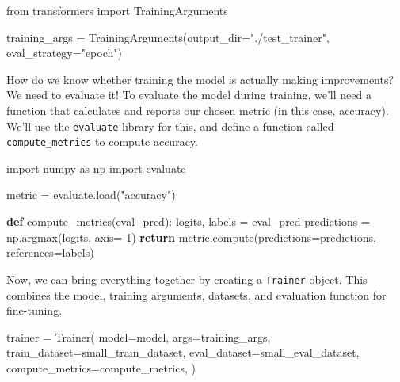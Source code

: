 \documentclass[
  letterpaper,
  DIV=11,
  numbers=noendperiod]{scrreprt}
\newenvironment{Shaded}{\begin{snugshade}}{\end{snugshade}}
\newcommand{\ControlFlowTok}[1]{\textcolor[rgb]{0.00,0.23,0.31}{\textbf{#1}}}
\newcommand{\DecValTok}[1]{\textcolor[rgb]{0.68,0.00,0.00}{#1}}
\newcommand{\ImportTok}[1]{\textcolor[rgb]{0.00,0.46,0.62}{#1}}
\newcommand{\KeywordTok}[1]{\textcolor[rgb]{0.00,0.23,0.31}{\textbf{#1}}}
\newcommand{\NormalTok}[1]{\textcolor[rgb]{0.00,0.23,0.31}{#1}}
\newcommand{\OperatorTok}[1]{\textcolor[rgb]{0.37,0.37,0.37}{#1}}
\newcommand{\StringTok}[1]{\textcolor[rgb]{0.13,0.47,0.30}{#1}}
\begin{document}
\begin{Shaded}
\begin{Highlighting}[]
\ImportTok{from}\NormalTok{ transformers }\ImportTok{import}\NormalTok{ TrainingArguments}

\NormalTok{training\_args }\OperatorTok{=}\NormalTok{ TrainingArguments(output\_dir}\OperatorTok{=}\StringTok{"./test\_trainer"}\NormalTok{, eval\_strategy}\OperatorTok{=}\StringTok{"epoch"}\NormalTok{)}
\end{Highlighting}
\end{Shaded}

How do we know whether training the model is actually making
improvements? We need to evaluate it! To evaluate the model during
training, we'll need a function that calculates and reports our chosen
metric (in this case, accuracy). We'll use the \texttt{evaluate} library
for this, and define a function called \texttt{compute\_metrics} to
compute accuracy.

\begin{Shaded}
\begin{Highlighting}[]
\ImportTok{import}\NormalTok{ numpy }\ImportTok{as}\NormalTok{ np}
\ImportTok{import}\NormalTok{ evaluate}

\NormalTok{metric }\OperatorTok{=}\NormalTok{ evaluate.load(}\StringTok{"accuracy"}\NormalTok{)}

\KeywordTok{def}\NormalTok{ compute\_metrics(eval\_pred):}
\NormalTok{    logits, labels }\OperatorTok{=}\NormalTok{ eval\_pred}
\NormalTok{    predictions }\OperatorTok{=}\NormalTok{ np.argmax(logits, axis}\OperatorTok{={-}}\DecValTok{1}\NormalTok{)}
    \ControlFlowTok{return}\NormalTok{ metric.compute(predictions}\OperatorTok{=}\NormalTok{predictions, references}\OperatorTok{=}\NormalTok{labels)}
\end{Highlighting}
\end{Shaded}

Now, we can bring everything together by creating a \texttt{Trainer}
object. This combines the model, training arguments, datasets, and
evaluation function for fine-tuning.

\begin{Shaded}
\begin{Highlighting}[]
\NormalTok{trainer }\OperatorTok{=}\NormalTok{ Trainer(}
\NormalTok{    model}\OperatorTok{=}\NormalTok{model,}
\NormalTok{    args}\OperatorTok{=}\NormalTok{training\_args,}
\NormalTok{    train\_dataset}\OperatorTok{=}\NormalTok{small\_train\_dataset,}
\NormalTok{    eval\_dataset}\OperatorTok{=}\NormalTok{small\_eval\_dataset,}
\NormalTok{    compute\_metrics}\OperatorTok{=}\NormalTok{compute\_metrics,}
\NormalTok{)}
\end{Highlighting}
\end{Shaded}
\end{document}
